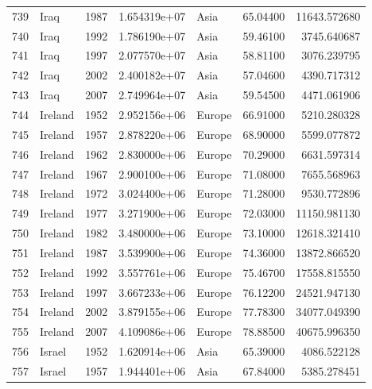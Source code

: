 \documentclass[
  letterpaper,
  DIV=11,
  numbers=noendperiod]{scrreprt}
\begin{document}
\begin{tabular}{llrrlrr}
739  &                      Iraq &  1987 &  1.654319e+07 &      Asia &  65.04400 &   11643.572680 \\
740  &                      Iraq &  1992 &  1.786190e+07 &      Asia &  59.46100 &    3745.640687 \\
741  &                      Iraq &  1997 &  2.077570e+07 &      Asia &  58.81100 &    3076.239795 \\
742  &                      Iraq &  2002 &  2.400182e+07 &      Asia &  57.04600 &    4390.717312 \\
743  &                      Iraq &  2007 &  2.749964e+07 &      Asia &  59.54500 &    4471.061906 \\
744  &                   Ireland &  1952 &  2.952156e+06 &    Europe &  66.91000 &    5210.280328 \\
745  &                   Ireland &  1957 &  2.878220e+06 &    Europe &  68.90000 &    5599.077872 \\
746  &                   Ireland &  1962 &  2.830000e+06 &    Europe &  70.29000 &    6631.597314 \\
747  &                   Ireland &  1967 &  2.900100e+06 &    Europe &  71.08000 &    7655.568963 \\
748  &                   Ireland &  1972 &  3.024400e+06 &    Europe &  71.28000 &    9530.772896 \\
749  &                   Ireland &  1977 &  3.271900e+06 &    Europe &  72.03000 &   11150.981130 \\
750  &                   Ireland &  1982 &  3.480000e+06 &    Europe &  73.10000 &   12618.321410 \\
751  &                   Ireland &  1987 &  3.539900e+06 &    Europe &  74.36000 &   13872.866520 \\
752  &                   Ireland &  1992 &  3.557761e+06 &    Europe &  75.46700 &   17558.815550 \\
753  &                   Ireland &  1997 &  3.667233e+06 &    Europe &  76.12200 &   24521.947130 \\
754  &                   Ireland &  2002 &  3.879155e+06 &    Europe &  77.78300 &   34077.049390 \\
755  &                   Ireland &  2007 &  4.109086e+06 &    Europe &  78.88500 &   40675.996350 \\
756  &                    Israel &  1952 &  1.620914e+06 &      Asia &  65.39000 &    4086.522128 \\
757  &                    Israel &  1957 &  1.944401e+06 &      Asia &  67.84000 &    5385.278451 \\

\end{tabular}
\end{document}

